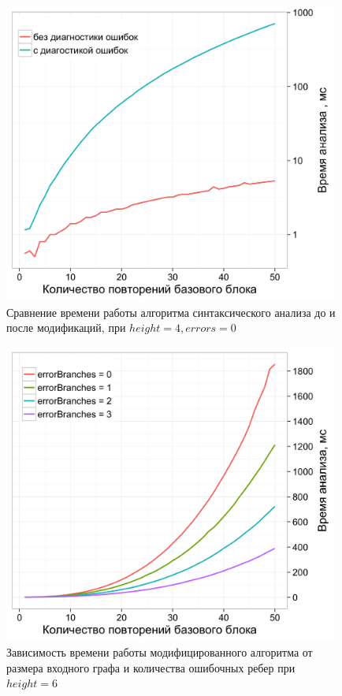 \begin{figure}[h!]
 \centering
 \includegraphics[width=11cm]{pictures/compare.png}
 \caption{Сравнение времени работы алгоритма синтаксического анализа до и после модификаций, при $height=4, errors=0$}
 \label{compare}
\end{figure}
\begin{figure}[h!]
 \centering
 \includegraphics[width=11cm]{pictures/error_branches4.png}
 \caption{Зависимость времени работы модифицированного алгоритма от размера входного графа и количества ошибочных ребер при $height=6$}
 \label{withErrors}
\end{figure}
\clearpage